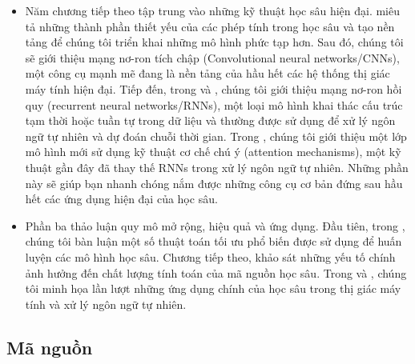 \documentclass[letterpaper,11pt,english]{sphinxmanual}
\begin{document}
\begin{itemize}
\item {} 
Năm chương tiếp theo tập trung vào những kỹ thuật học sâu hiện đại.
 miêu tả những thành phần thiết yếu của
các phép tính trong học sâu và tạo nền tảng để chúng tôi triển khai
những mô hình phức tạp hơn. Sau đó, chúng tôi sẽ giới thiệu mạng
nơ-ron tích chập (Convolutional neural networks/CNNs), một công cụ
mạnh mẽ đang là nền tảng của hầu hết các hệ thống thị giác máy tính
hiện đại. Tiếp đến, trong  và
, chúng tôi giới thiệu mạng nơ-ron hồi quy
(recurrent neural networks/RNNs), một loại mô hình khai thác cấu trúc
tạm thời hoặc tuần tự trong dữ liệu và thường được sử dụng để xử lý
ngôn ngữ tự nhiên và dự đoán chuỗi thời gian. Trong
, chúng tôi giới thiệu một lớp mô hình mới
sử dụng kỹ thuật cơ chế chú ý (attention mechanisms), một kỹ thuật
gần đây đã thay thế RNNs trong xử lý ngôn ngữ tự nhiên. Những phần
này sẽ giúp bạn nhanh chóng nắm được những công cụ cơ bản đứng sau
hầu hết các ứng dụng hiện đại của học sâu.

\end{itemize}


\begin{itemize}
\item {} 
Phần ba thảo luận quy mô mở rộng, hiệu quả và ứng dụng. Đầu tiên,
trong , chúng tôi bàn luận một số thuật
toán tối ưu phổ biến được sử dụng để huấn luyện các mô hình học sâu.
Chương tiếp theo,  khảo sát những yếu tố
chính ảnh hưởng đến chất lượng tính toán của mã nguồn học sâu. Trong
 và , chúng tôi minh họa lần
lượt những ứng dụng chính của học sâu trong thị giác máy tính và xử
lý ngôn ngữ tự nhiên.

\end{itemize}






\subsection{Mã nguồn}
\label{\detokenize{chapter_preface/index_vn:ma-nguon}}\label{\detokenize{chapter_preface/index_vn:sec-code}}
\end{document}
